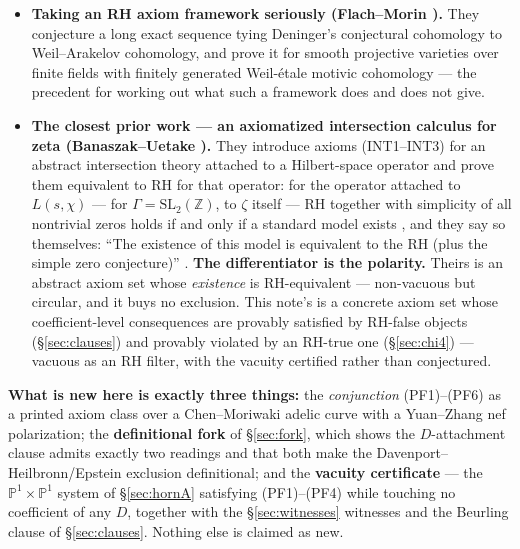 \documentclass[11pt]{article}
\theoremstyle{plain}
\theoremstyle{definition}
\theoremstyle{remark}
\begin{document}
\begin{itemize}
2.1--2.12 and then proves (Theorem~2.13) that no such theory exists. The method is
the same --- state the axioms, then show what they cannot do --- and the
differentiator is the conclusion's strength: his is an impossibility theorem, this
note's is a \emph{vacuity} certificate at coefficient level. (The property his
Theorem~2.13 refutes is 2.12, the Galois-equivariant order-of-vanishing property,
not his spectral axiom 2.3 and not his positivity hypothesis 2.7.)
\item \textbf{Taking an RH axiom framework seriously (Flach--Morin \cite{FM20}).}
They conjecture a long exact sequence tying Deninger's conjectural cohomology to
Weil--Arakelov cohomology, and prove it for smooth projective varieties over finite
fields with finitely generated Weil-\'etale motivic cohomology --- the precedent for
working out what such a framework does and does not give.
\item \textbf{The closest prior work --- an axiomatized intersection calculus for
zeta (Banaszak--Uetake \cite{BU1, BU2, BU3}).} They introduce axioms (INT1--INT3)
for an abstract intersection theory attached to a Hilbert-space operator and prove
them equivalent to RH for that operator: for the operator attached to $L(s, \chi)$
--- for $\Gamma = \mathrm{SL}_2(\mathbb{Z})$, to $\zeta$ itself --- RH together
with simplicity of all nontrivial zeros holds if and only if a standard model exists
\cite[Thm.~5.4]{BU2}, and they say so themselves: ``The existence of this model is
equivalent to the RH (plus the simple zero conjecture)'' \cite[\S1]{BU3}.
\textbf{The differentiator is the polarity.} Theirs is an abstract axiom set whose
\emph{existence} is RH-equivalent --- non-vacuous but circular, and it buys no
exclusion. This note's is a concrete axiom set whose coefficient-level consequences
are provably satisfied by RH-false objects (\S\ref{sec:clauses}) and provably
violated by an RH-true one (\S\ref{sec:chi4}) --- vacuous as an RH filter, with the
vacuity certified rather than conjectured.
\end{itemize}

\noindent\textbf{What is new here is exactly three things:} the \emph{conjunction}
(PF1)--(PF6) as a printed axiom class over a Chen--Moriwaki adelic curve with a
Yuan--Zhang nef polarization; the \textbf{definitional fork} of
\S\ref{sec:fork}, which shows the $D$-attachment clause admits exactly two
readings and that both make the Davenport--Heilbronn/Epstein exclusion definitional;
and the \textbf{vacuity certificate} --- the
$\mathbb{P}^1 \times \mathbb{P}^1$ system of \S\ref{sec:hornA} satisfying
(PF1)--(PF4) while touching no coefficient of any $D$, together with the
\S\ref{sec:witnesses} witnesses and the Beurling clause of \S\ref{sec:clauses}.
Nothing else is claimed as new.
\end{document}
